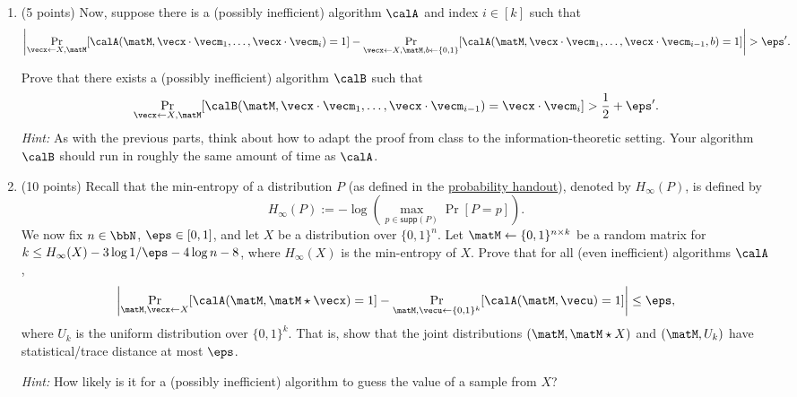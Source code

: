 \documentclass{article}
\begin{document}
\begin{enumerate}
    Prove that there exists a (possibly inefficient) algorithm $\calB$ and index $i \in [k]$ such that
        \[ \left| \Pr_{\vecx \gets X, \matM}[\calB(\matM, \vecx \cdot \vecm_1, \ldots, \vecx \cdot \vecm_i) = 1] - \Pr_{\vecx \gets X, \matM, b \gets \{0, 1\}}[\calB(\matM, \vecx \cdot \vecm_1, \ldots, \vecx \cdot \vecm_{i-1}, b) = 1] \right| > \frac{\eps}{k}. \]
    \emph{Hint:} Think about how to adapt the proof from class to the information-theoretic setting. Your algorithm $\calB$ should run in roughly the same amount of time as $\calA$.
    \item (5 points) Now, suppose there is a (possibly inefficient) algorithm $\calA$ and index $i \in [k]$ such that
        \[ \left| \Pr_{\vecx \gets X, \matM}[\calA(\matM, \vecx \cdot \vecm_1, \ldots, \vecx \cdot \vecm_i) = 1] - \Pr_{\vecx \gets X, \matM, b \gets \{0, 1\}}[\calA(\matM, \vecx \cdot \vecm_1, \ldots, \vecx \cdot \vecm_{i-1}, b) = 1] \right| > \eps'. \]
    
    Prove that there exists a (possibly inefficient) algorithm $\calB$ such that
        \[ \Pr_{\vecx \gets X, \matM}[\calB(\matM, \vecx \cdot \vecm_1, \ldots, \vecx \cdot \vecm_{i-1}) = \vecx \cdot \vecm_i] > \frac{1}{2}+\eps'. \]
    \emph{Hint:} As with the previous parts, think about how to adapt the proof from class to the information-theoretic setting. Your algorithm $\calB$ should run in roughly the same amount of time as $\calA$.
    \item (10 points) Recall that the min-entropy of a distribution $P$ (as defined in the \href{https://mit6875.github.io/FA23HANDOUTS/probability.pdf}{probability handout}), denoted by $H_{\infty}(P)$, is defined by
        \[ H_{\infty}(P) := -\log(\max_{p \in \mathsf{supp}(P)}\Pr[P = p]). \] 
    We now fix $n \in \bbN$, $\eps \in [0, 1]$, and let $X$ be a distribution over $\{0, 1\}^n$. Let $\matM \gets \{0, 1\}^{n \times k}$ be a random matrix for $k \leq H_{\infty}(X)-3\log 1/\eps-4\log n-8$, where $H_{\infty}(X)$ is the min-entropy of $X$. Prove that for all (even inefficient) algorithms $\calA$,
        \[ \left|\Pr_{\matM, \vecx \gets X}[\calA(\matM, \matM \star \vecx) = 1] -\Pr_{\matM, \vecu \gets \{0, 1\}^k}[\calA(\matM, \vecu) = 1]\right| \leq \eps, \]
    where $U_k$ is the uniform distribution over $\{0, 1\}^k$. That is, show that the joint distributions $(\matM, \matM \star X)$ and $(\matM, U_k)$ have statistical/trace distance at most $\eps$.
    
    \emph{Hint:} How likely is it for a (possibly inefficient) algorithm to guess the value of a sample from $X$?
\end{enumerate}
\end{document}
